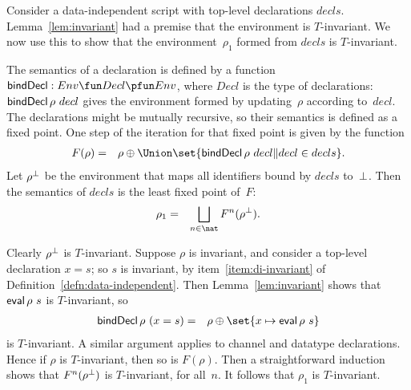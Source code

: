 


  
Consider a data-independent script with top-level declarations $decls$.
Lemma~\ref{lem:invariant} had a premise that the environment is $T$-invariant.
We now use this to show that the environment~$\rho_1$ formed from $decls$ is
$T$-invariant.

The semantics of a declaration is defined by a function $\bindDecl : Env \fun
Decl \pfun Env$, where $Decl$ is the type of declarations: $\mathop{\sf bindDecl}
\rho~decl$ gives the environment formed by updating~$\rho$ according to~$decl$. 
%
The declarations might be mutually recursive, so their semantics is defined as
a fixed point.  One step of the iteration for that fixed point is given by the
function
%
\begin{eqnarray*}
F(\rho) & = & \rho \oplus \Union \set{\bindDecl \rho ~ decl \| decl \in decls}.
\end{eqnarray*}
%
Let $\rho^\perp$ be the environment that maps all identifiers bound by
$decls$ to~$\perp$.  Then the semantics of $decls$ is the least fixed point
of~$F$: 
\begin{eqnarray*}
\rho_1 & = & \bigsqcup_{n \in \nat} F^n(\rho^\bottom).
\end{eqnarray*}

Clearly $\rho^\perp$ is $T$-invariant.  
%
Suppose $\rho$ is invariant, and consider a top-level declaration $x = s$;
so $s$ is invariant, by item~\ref{item:di-invariant} of
Definition~\ref{defn:data-independent}.  Then Lemma~\ref{lem:invariant} shows
that $\mathop{\sf eval} \rho~s$ is $T$-invariant, so 
\begin{eqnarray*}
\bindDecl \rho~(x = s) & = & \rho \oplus \set{x \mapsto \eval \rho~s}
\end{eqnarray*}
is $T$-invariant.  A similar argument applies to channel and datatype
declarations.  Hence if $\rho$ is $T$-invariant, then so is $F(\rho)$.
%
Then a straightforward induction shows that $F^n(\rho^\perp)$ is
$T$-invariant, for all~$n$.  It follows that $\rho_1$ is $T$-invariant.




